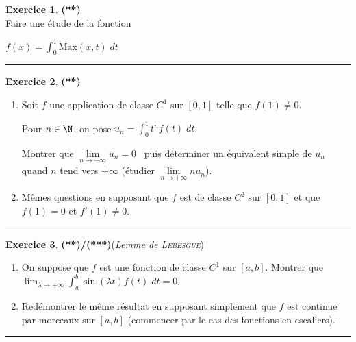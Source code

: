 \documentclass[a4paper,11pt]{article}
\theoremstyle{definition}
\newtheorem{exo}{Exercice} %
\begin{document}
\begin{minipage}{1\linewidth}
\begin{minipage}[t]{0.48\linewidth}
\begin{exo}\textbf{(**)}\quad\\[0.2cm]
Faire une étude de la fonction

$f(x)=\int_{0}^{1}\mbox{Max}(x,t)\;dt$
\centering\rule{1\linewidth}{0.6pt}\end{exo}


\begin{exo}\textbf{(**)}\quad\\[0.2cm]
\begin{enumerate}
	\item  Soit $f$ une application de classe $C^1$ sur $[0,1]$ telle que $f(1)\neq0$.
	
	Pour $n\in\N$, on pose $u_n=\int_{0}^{1}t^nf(t)\;dt$. 
	
	Montrer que $\lim\limits_{n\rightarrow +\infty}u_n=0$ \ puis déterminer un équivalent simple de $u_n$ quand $n$ tend vers $+\infty$ (étudier $\lim\limits_{n\rightarrow +\infty}nu_n$).
	\item  Mêmes questions en supposant que $f$ est de classe $C^2$ sur $[0,1]$ et que $f(1)=0$ et $f'(1)\neq0$.
\end{enumerate}

\centering\rule{1\linewidth}{0.6pt}\end{exo}

	\begin{exo}\textbf{(**)/(***)}\quad (\textit{Lemme de \textsc{Lebesgue}})\\[0.2cm]
	\begin{enumerate}
		\item  On suppose que $f$ est une fonction de classe $C^1$ sur $[a,b]$. Montrer que $\lim_{\lambda\rightarrow +\infty}\int_{a}^{b}\sin(\lambda t)f(t)\;dt=0$.
		\item Redémontrer le même résultat en supposant simplement que $f$ est continue par morceaux sur $[a,b]$ (commencer par le cas des fonctions en escaliers).
	\end{enumerate}
	
	
	\centering\rule{1\linewidth}{0.6pt}\end{exo}


\end{minipage}\end{minipage} \newpage
\end{document}
